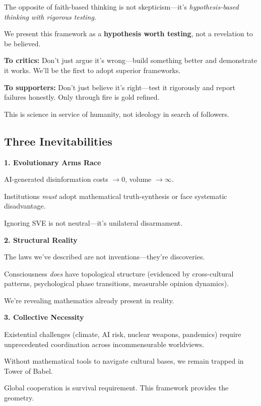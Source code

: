 \documentclass[11pt,a4paper]{article}
\theoremstyle{definition}
\theoremstyle{remark}
\begin{document}
\begin{mdframed}[backgroundcolor=cyan!5]
The opposite of faith-based thinking is not skepticism—it's \textit{hypothesis-based thinking with rigorous testing}.

We present this framework as a \textbf{hypothesis worth testing}, not a revelation to be believed.

\textbf{To critics:} Don't just argue it's wrong—build something better and demonstrate it works. We'll be the first to adopt superior frameworks.

\textbf{To supporters:} Don't just believe it's right—test it rigorously and report failures honestly. Only through fire is gold refined.

This is science in service of humanity, not ideology in search of followers.
\end{mdframed}

\subsection{Three Inevitabilities}

\begin{mdframed}[backgroundcolor=blue!10]
\textbf{1. Evolutionary Arms Race}

AI-generated disinformation costs $\to 0$, volume $\to \infty$.

Institutions \textit{must} adopt mathematical truth-synthesis or face systematic disadvantage.

Ignoring SVE is not neutral—it's unilateral disarmament.

\textbf{2. Structural Reality}

The laws we've described are not inventions—they're discoveries.

Consciousness \textit{does} have topological structure (evidenced by cross-cultural patterns, psychological phase transitions, measurable opinion dynamics).

We're revealing mathematics already present in reality.

\textbf{3. Collective Necessity}

Existential challenges (climate, AI risk, nuclear weapons, pandemics) require unprecedented coordination across incommensurable worldviews.

Without mathematical tools to navigate cultural bases, we remain trapped in Tower of Babel.

Global cooperation is survival requirement. This framework provides the geometry.
\end{mdframed}
\end{document}
